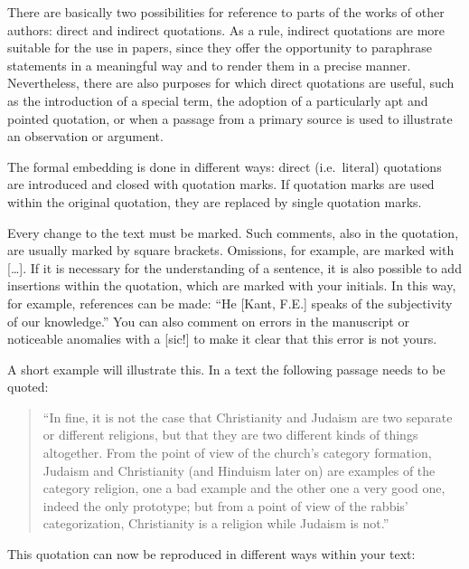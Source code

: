 \documentclass[
  english,
]{scrreprt}
\begin{document}
There are basically two possibilities for reference to parts of the works of other authors: direct and indirect quotations. As a rule, indirect quotations are more suitable for the use in papers, since they offer the opportunity to paraphrase statements in a meaningful way and to render them in a precise manner. Nevertheless, there are also purposes for which direct quotations are useful, such as the introduction of a special term, the adoption of a particularly apt and pointed quotation, or when a passage from a primary source is used to illustrate an observation or argument.

The formal embedding is done in different ways: direct (i.e.~literal) quotations are introduced and closed with quotation marks. If quotation marks are used within the original quotation, they are replaced by single quotation marks.

Every change to the text must be marked. Such comments, also in the quotation, are usually marked by square brackets. Omissions, for example, are marked with {[}…{]}. If it is necessary for the understanding of a sentence, it is also possible to add insertions within the quotation, which are marked with your initials. In this way, for example, references can be made: “He {[}Kant, F.E.{]} speaks of the subjectivity of our knowledge.” You can also comment on errors in the manuscript or noticeable anomalies with a {[}sic!{]} to make it clear that this error is not yours.

A short example will illustrate this. In a text the following passage needs to be quoted:

\begin{quote}
“In fine, it is not the case that Christianity and Judaism are two separate or different religions, but that they are two different kinds of things altogether. From the point of view of the church’s category formation, Judaism and Christianity (and Hinduism later on) are examples of the category religion, one a bad example and the other one a very good one, indeed the only prototype; but from a point of view of the rabbis’ categorization, Christianity is a religion while Judaism is not.”
\end{quote}

This quotation can now be reproduced in different ways within your text:
\end{document}
